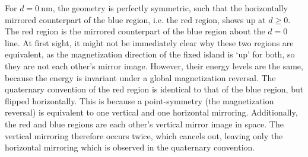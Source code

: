 \documentclass[11pt,a4paper,english,twoside]{article}
\begin{document}
For $d=\SI{0}{\nano\metre}$, the geometry is perfectly symmetric, such that the horizontally mirrored counterpart of the blue region, i.e. the red region, shows up at $d \geq 0$. The red region is the mirrored counterpart of the blue region about the $d=0$ line. At first sight, it might not be immediately clear why these two regions are equivalent, as the magnetization direction of the fixed island is `up' for both, so they are not each other's mirror image. However, their energy levels are the same, because the energy is invariant under a global magnetization reversal. The quaternary convention of the red region is identical to that of the blue region, but flipped horizontally. This is because a point-symmetry (the magnetization reversal) is equivalent to one vertical and one horizontal mirroring. Additionally, the red and blue regions are each other's vertical mirror image in space. The vertical mirroring therefore occurs twice, which cancels out, leaving only the horizontal mirroring which is observed in the quaternary convention. \par %
\end{document}
